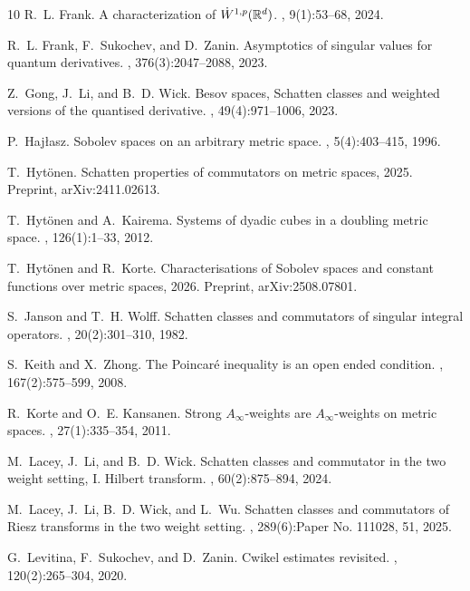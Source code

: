 \documentclass[reqno]{amsart}
\theoremstyle{plain}
\theoremstyle{definition}
\theoremstyle{remark}
\begin{document}
\begin{thebibliography}{10}
R.~L. Frank.
\newblock A characterization of {$\dot W{}^{1,p}(\Bbb R^d)$}.
, 9(1):53--68, 2024.

R.~L. Frank, F.~Sukochev, and D.~Zanin.
\newblock Asymptotics of singular values for quantum derivatives.
, 376(3):2047--2088, 2023.

Z.~Gong, J.~Li, and B.~D. Wick.
\newblock Besov spaces, {S}chatten classes and weighted versions of the
  quantised derivative.
, 49(4):971--1006, 2023.

P.~Haj\l{}asz.
\newblock Sobolev spaces on an arbitrary metric space.
, 5(4):403--415, 1996.

T.~Hyt\"onen.
\newblock Schatten properties of commutators on metric spaces, 2025.
\newblock Preprint, arXiv:2411.02613.

T.~Hyt\"{o}nen and A.~Kairema.
\newblock Systems of dyadic cubes in a doubling metric space.
, 126(1):1--33, 2012.

T.~Hyt\"onen and R.~Korte.
\newblock Characterisations of {S}obolev spaces and constant functions over
  metric spaces, 2026.
\newblock Preprint, arXiv:2508.07801.

S.~Janson and T.~H. Wolff.
\newblock Schatten classes and commutators of singular integral operators.
, 20(2):301--310, 1982.

S.~Keith and X.~Zhong.
\newblock The {P}oincar\'{e} inequality is an open ended condition.
, 167(2):575--599, 2008.

R.~Korte and O.~E. Kansanen.
\newblock Strong {$A_\infty$}-weights are {$A_\infty$}-weights on metric
  spaces.
, 27(1):335--354, 2011.

M.~Lacey, J.~Li, and B.~D. Wick.
\newblock Schatten classes and commutator in the two weight setting, {I}.
  {H}ilbert transform.
, 60(2):875--894, 2024.

M.~Lacey, J.~Li, B.~D. Wick, and L.~Wu.
\newblock Schatten classes and commutators of {R}iesz transforms in the two
  weight setting.
, 289(6):Paper No. 111028, 51, 2025.

G.~Levitina, F.~Sukochev, and D.~Zanin.
\newblock Cwikel estimates revisited.
, 120(2):265--304, 2020.


\end{thebibliography}
\end{document}
